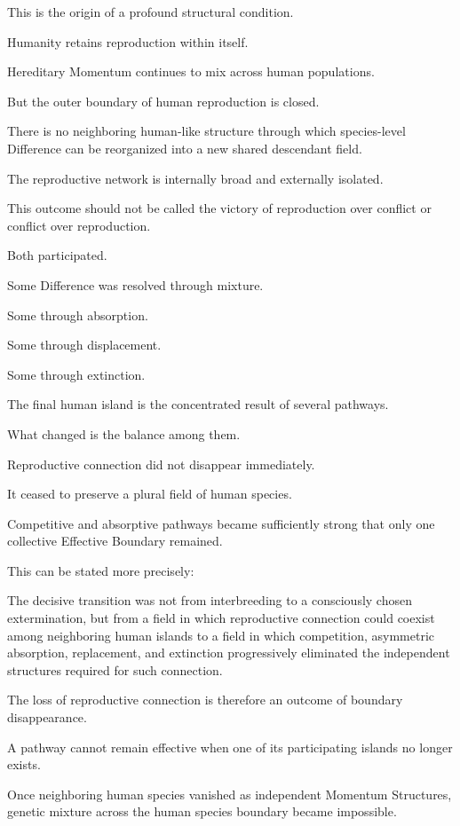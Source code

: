 This is the origin of a profound structural condition.

Humanity retains reproduction within itself.

Hereditary Momentum continues to mix across human populations.

But the outer boundary of human reproduction is closed.

There is no neighboring human-like structure through which species-level Difference can be reorganized into a new shared descendant field.

The reproductive network is internally broad and externally isolated.

This outcome should not be called the victory of reproduction over conflict or conflict over reproduction.

Both participated.

Some Difference was resolved through mixture.

Some through absorption.

Some through displacement.

Some through extinction.

The final human island is the concentrated result of several pathways.

What changed is the balance among them.

Reproductive connection did not disappear immediately.

It ceased to preserve a plural field of human species.

Competitive and absorptive pathways became sufficiently strong that only one collective Effective Boundary remained.

This can be stated more precisely:

The decisive transition was not from interbreeding to a consciously chosen extermination, but from a field in which reproductive connection could coexist among neighboring human islands to a field in which competition, asymmetric absorption, replacement, and extinction progressively eliminated the independent structures required for such connection.

The loss of reproductive connection is therefore an outcome of boundary disappearance.

A pathway cannot remain effective when one of its participating islands no longer exists.

Once neighboring human species vanished as independent Momentum Structures, genetic mixture across the human species boundary became impossible.

